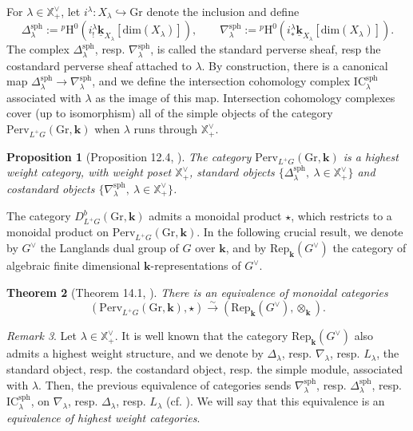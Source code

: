 \documentclass[11pt]{amsart}
\theoremstyle{plain}
\newtheorem{thm}{Theorem}[section]
\newtheorem{prop}[thm]{Proposition}
\theoremstyle{remark}
\newtheorem{rem}[thm]{Remark}
\numberwithin{equation}{section}
\begin{document}
	For $\lambda\in\mathbb{X}^\vee_+$, let $i^\lambda:X_\lambda\hookrightarrow\mathrm{Gr}$ denote the inclusion and define
	$$\Delta^{\mathrm{sph}}_\lambda:={^p\mathrm{H}}^0(i^\lambda_{ !}\underline{\mathbf{k}}_{X_\lambda}[\mathrm{dim}(X_\lambda)]),\qquad\nabla^{\mathrm{sph}}_\lambda:={^p\mathrm{H}}^0(i^\lambda_{ *}\underline{\mathbf{k}}_{X_\lambda}[\mathrm{dim}(X_\lambda)]).$$
	The complex $\Delta^{\mathrm{sph}}_\lambda$, resp. $\nabla^{\mathrm{sph}}_\lambda$, is called the standard perverse sheaf, resp the costandard perverse sheaf attached to $\lambda$. By construction, there is a canonical map $\Delta^{\mathrm{sph}}_\lambda\to\nabla^{\mathrm{sph}}_\lambda$, and we define the intersection cohomology complex $\mathrm{IC}_\lambda^{\mathrm{sph}}$ associated with $\lambda$ as the image of this map. Intersection cohomology complexes cover (up to isomorphism) all of the simple objects of the category $\mathrm{Perv}_{L^+G}(\mathrm{Gr},\mathbf{k})$ when $\lambda$ runs through $\mathbb{X}^\vee_+$. 
	\begin{prop}[Proposition 12.4, \cite{baumann:hal-01491529}]
		The category $\mathrm{Perv}_{L^+G}(\mathrm{Gr},\mathbf{k})$ is a highest weight category, with weight poset $\mathbb{X}^\vee_+$, standard objects $\{\Delta^{\mathrm{sph}}_\lambda,~\lambda\in \mathbb{X}^\vee_+\}$ and costandard objects $\{\nabla^{\mathrm{sph}}_\lambda,~\lambda\in \mathbb{X}^\vee_+\}$.
	\end{prop}
	
	
	The category $D^b_{L^+G}(\mathrm{Gr},\mathbf{k})$ admits a monoidal product $\star$, which restricts to a monoidal product on $\mathrm{Perv}_{L^+G}(\mathrm{Gr},\mathbf{k})$. In the following crucial result, we denote by $G^\vee$ the Langlands dual group of $G$ over $\mathbf{k}$, and by $\mathrm{Rep}_\mathbf{k}(G^\vee)$ the category of algebraic finite dimensional $\mathbf{k}$-representations of $G^\vee$.
	\begin{thm}[Theorem 14.1, \cite{Mirkovic2004GeometricLD}]\label{satake equivalence}
		There is an equivalence of monoidal categories 
		$$(\mathrm{Perv}_{L^+G}(\mathrm{Gr},\mathbf{k}),\star)\xrightarrow{\sim} (\mathrm{Rep}_\mathbf{k}(G^\vee),\otimes_\mathbf{k}).$$
	\end{thm}
	\begin{rem}
		Let $\lambda\in\mathbb{X}^\vee_+$. It is well known that the category $\mathrm{Rep}_\mathbf{k}(G^\vee)$ also admits a highest weight structure, and we denote by $\Delta_\lambda$, resp. $\nabla_\lambda$, resp. $L_\lambda$, the standard object, resp. the costandard object, resp. the simple module, associated with $\lambda$. Then, the previous equivalence of categories sends $\nabla_\lambda^{\mathrm{sph}}$, resp. $\Delta_\lambda^{\mathrm{sph}}$, resp. $\mathrm{IC}_\lambda^{\mathrm{sph}}$, on $\nabla_\lambda$, resp. $\Delta_\lambda$, resp. $L_\lambda$ (cf. \cite[Proposition 13.1]{Mirkovic2004GeometricLD}). We will say that this equivalence is an \textit{equivalence of highest weight categories}.
	\end{rem}
	
\end{document}

